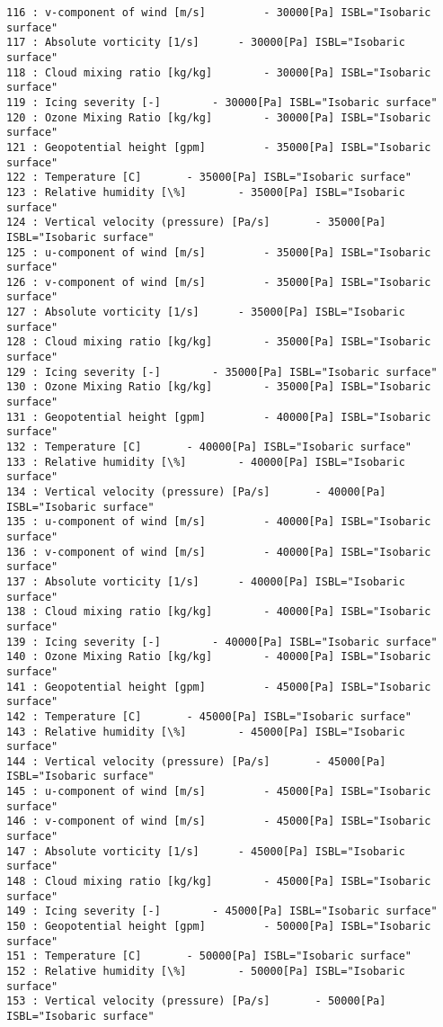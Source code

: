 \documentclass[11pt]{article}
\begin{document}
\begin{Verbatim}[commandchars=\\\{\}]
116 : v-component of wind [m/s] 		- 30000[Pa] ISBL="Isobaric surface"
117 : Absolute vorticity [1/s] 		- 30000[Pa] ISBL="Isobaric surface"
118 : Cloud mixing ratio [kg/kg] 		- 30000[Pa] ISBL="Isobaric surface"
119 : Icing severity [-] 		- 30000[Pa] ISBL="Isobaric surface"
120 : Ozone Mixing Ratio [kg/kg] 		- 30000[Pa] ISBL="Isobaric surface"
121 : Geopotential height [gpm] 		- 35000[Pa] ISBL="Isobaric surface"
122 : Temperature [C] 		- 35000[Pa] ISBL="Isobaric surface"
123 : Relative humidity [\%] 		- 35000[Pa] ISBL="Isobaric surface"
124 : Vertical velocity (pressure) [Pa/s] 		- 35000[Pa] ISBL="Isobaric surface"
125 : u-component of wind [m/s] 		- 35000[Pa] ISBL="Isobaric surface"
126 : v-component of wind [m/s] 		- 35000[Pa] ISBL="Isobaric surface"
127 : Absolute vorticity [1/s] 		- 35000[Pa] ISBL="Isobaric surface"
128 : Cloud mixing ratio [kg/kg] 		- 35000[Pa] ISBL="Isobaric surface"
129 : Icing severity [-] 		- 35000[Pa] ISBL="Isobaric surface"
130 : Ozone Mixing Ratio [kg/kg] 		- 35000[Pa] ISBL="Isobaric surface"
131 : Geopotential height [gpm] 		- 40000[Pa] ISBL="Isobaric surface"
132 : Temperature [C] 		- 40000[Pa] ISBL="Isobaric surface"
133 : Relative humidity [\%] 		- 40000[Pa] ISBL="Isobaric surface"
134 : Vertical velocity (pressure) [Pa/s] 		- 40000[Pa] ISBL="Isobaric surface"
135 : u-component of wind [m/s] 		- 40000[Pa] ISBL="Isobaric surface"
136 : v-component of wind [m/s] 		- 40000[Pa] ISBL="Isobaric surface"
137 : Absolute vorticity [1/s] 		- 40000[Pa] ISBL="Isobaric surface"
138 : Cloud mixing ratio [kg/kg] 		- 40000[Pa] ISBL="Isobaric surface"
139 : Icing severity [-] 		- 40000[Pa] ISBL="Isobaric surface"
140 : Ozone Mixing Ratio [kg/kg] 		- 40000[Pa] ISBL="Isobaric surface"
141 : Geopotential height [gpm] 		- 45000[Pa] ISBL="Isobaric surface"
142 : Temperature [C] 		- 45000[Pa] ISBL="Isobaric surface"
143 : Relative humidity [\%] 		- 45000[Pa] ISBL="Isobaric surface"
144 : Vertical velocity (pressure) [Pa/s] 		- 45000[Pa] ISBL="Isobaric surface"
145 : u-component of wind [m/s] 		- 45000[Pa] ISBL="Isobaric surface"
146 : v-component of wind [m/s] 		- 45000[Pa] ISBL="Isobaric surface"
147 : Absolute vorticity [1/s] 		- 45000[Pa] ISBL="Isobaric surface"
148 : Cloud mixing ratio [kg/kg] 		- 45000[Pa] ISBL="Isobaric surface"
149 : Icing severity [-] 		- 45000[Pa] ISBL="Isobaric surface"
150 : Geopotential height [gpm] 		- 50000[Pa] ISBL="Isobaric surface"
151 : Temperature [C] 		- 50000[Pa] ISBL="Isobaric surface"
152 : Relative humidity [\%] 		- 50000[Pa] ISBL="Isobaric surface"
153 : Vertical velocity (pressure) [Pa/s] 		- 50000[Pa] ISBL="Isobaric surface"

\end{Verbatim}
\end{document}
